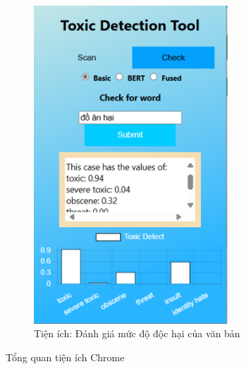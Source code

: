 \begin{figure}[htb!]
\begin{subfigure}[b]{0.33\textwidth}
        \includegraphics[width=0.8\textwidth]{image/ex_text_eval.png}
        \caption{Tiện ích: Đánh giá mức độ độc hại của văn bản}
        \label{figure:ex_text_eval}
    \end{subfigure}
    \caption{Tổng quan tiện ích Chrome}
\end{figure}



